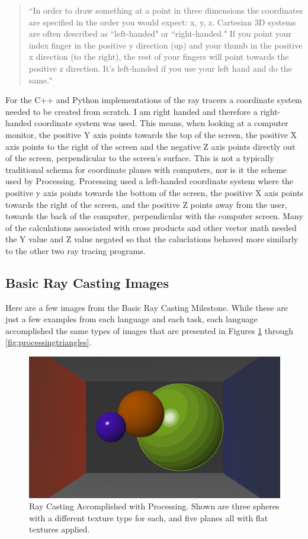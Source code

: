\begin{quote}
``In order to draw something at a point in three dimensions the coordinates are specified in the order you would expect: x, y, z. Cartesian 3D systems are often described as ``left-handed" or ``right-handed." If you point your index finger in the positive y direction (up) and your thumb in the positive x direction (to the right), the rest of your fingers will point towards the positive z direction. It's left-handed if you use your left hand and do the same."
\end{quote}
For the C++ and Python implementations of the ray tracers a coordinate system needed to be created from scratch. I am right handed and therefore a right-handed coordinate system was used.  This means, when looking at a computer monitor, the positive Y axis points towards the top of the screen, the positive X axis points to the right of the screen and the negative Z axis points directly out of the screen, perpendicular to the screen's surface.  This is not a typically traditional schema for coordinate planes with computers, nor is it the scheme used by Processing.  Processing used a left-handed coordinate system where the positive y axis points towards the bottom of the screen, the positive X axis points towards the right of the screen, and the positive Z points away from the user, towards the back of the computer, perpendicular with the computer screen.  Many of the calculations associated with cross products and other vector math needed the Y value and Z value negated so that the caluclations behaved more similarly to the other two ray tracing programs.
\subsection{Basic Ray Casting Images}
Here are a few images from the Basic Ray Casting Milestone.  While these are just a few examples from each language and each task, each language accomplished the same types of images that are presented in Figures \ref{fig:processingraycasting} through \ref{fig:processingtriangles}.
\begin{figure}[ht]
\centering
\includegraphics[width=\textwidth]{figures/BasicRayCastingProcessing.png}
\caption{Ray Casting Accomplished with Processing. Shown are three spheres with a different texture type for each, and five planes all with flat textures applied.}
\label{fig:processingraycasting}
\end{figure}

